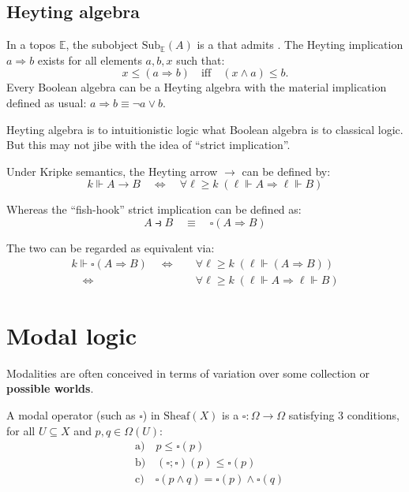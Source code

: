 \subsection{Heyting algebra}

In a topos $\mathbb{E}$, the subobject $\mathrm{Sub}_{\mathbb{E}}(A)$ is a  that admits .  The Heyting implication $a \Rightarrow b$ exists for all elements $a, b, x$ such that:
\begin{equation}
x \le (a \Rightarrow b) \quad \mbox{iff} \quad (x \wedge a) \le b.
\end{equation}
Every Boolean algebra can be a Heyting algebra with the material implication defined as usual: $a \Rightarrow b \equiv \neg a \vee b$.

Heyting algebra is to intuitionistic logic what Boolean algebra is to classical logic.  But this may not jibe with the idea of ``strict implication''.

Under Kripke semantics, the Heyting arrow $\rightarrow$ can be defined by:
\begin{equation}
k \Vdash A \rightarrow B \quad \Leftrightarrow \quad \forall \ell \ge k \; (\ell \Vdash A \Rightarrow \ell \Vdash B)
\end{equation}

Whereas the ``fish-hook'' strict implication can be defined as:
\begin{equation}
A \strictif B \quad \equiv \quad \square (A \Rightarrow B) 
\end{equation}

The two can be regarded as equivalent via:
\begin{equation}
\begin{aligned}
k \Vdash \square (A \Rightarrow B) \quad \Leftrightarrow \quad & \forall \ell \ge k \; (\ell \Vdash (A \Rightarrow B)) \\
\quad \Leftrightarrow \quad & \forall \ell \ge k \; (\ell \Vdash A \Rightarrow \ell \Vdash B)
\end{aligned}
\end{equation}

\section{Modal logic}

Modalities are often conceived in terms of variation over some collection or \textbf{possible worlds}.

A modal operator (such as $\square$) in $\mathrm{Sheaf}(X)$ is a  $\square: \Omega \rightarrow \Omega$ satisfying 3 conditions, for all $U \subseteq X$ and $p, q \in \Omega(U)$:
\begin{equation}
\begin{aligned}
& \mbox{a)} \quad p \le \square (p) \\
& \mbox{b)} \quad (\square ; \square) (p) \le \square (p) \\
& \mbox{c)} \quad \square (p \wedge q) = \square (p) \wedge \square (q)
\end{aligned}
\end{equation}

